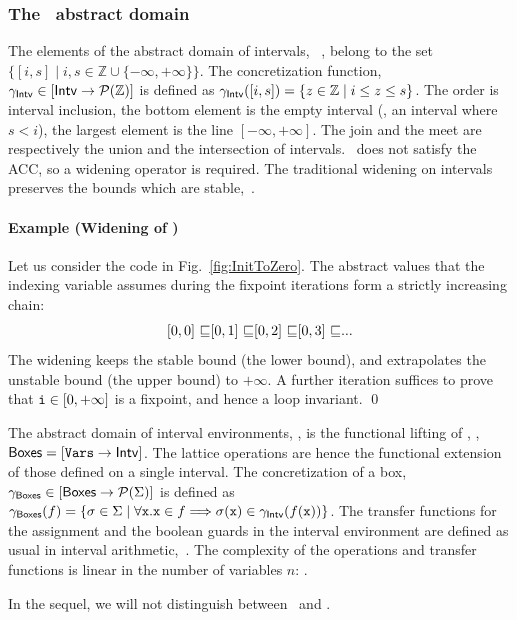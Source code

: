 \documentclass[10pt]{sigplanconf}
\begin{document}
\subsubsection*{The \Intervals\  abstract domain}
The elements of the abstract domain of intervals, \Intervals  ~\cite{CousotCousot77}, belong to the set $\{ [i, s] \mid i,s \in \mathbb{Z} \cup \{-\infty, + \infty\} \}$.
The concretization function, $\gamma_{\mathsf{Intv}} \in [\mathsf{Intv} \rightarrow\mathcal{P}{(\mathbb{Z})}]$ is defined as $\gamma_{\mathsf{Intv}}([i, s]) = \{ z \in \mathbb{Z} \mid i \leq z \leq s\}$.
The order is interval inclusion, the bottom  element is the empty interval (\ie, an interval where $s < i$), the largest element is the line $[-\infty, +\infty]$. The join and the meet are respectively the union and the intersection of intervals.
\Intervals\ does not satisfy the ACC, so a widening operator is required.
 The traditional  widening on intervals preserves the bounds which are stable,~\cite{CousotCousot77}. 

\paragraph{Example (Widening of \Intervals)}
Let us consider the code in Fig.~\ref{fig:InitToZero}.
The abstract values that the indexing variable  assumes  during the fixpoint iterations form a strictly increasing chain:   
\[
[0, 0] \ \aless [0, 1] \ \aless [0, 2] \ \aless [0, 3] \ \aless ... 
\]
The widening  keeps the stable bound (the lower bound), and extrapolates the unstable bound (the upper bound) to $+\infty$.
A further iteration suffices to prove that $\mathtt{i} \in [0, +\infty]$ is a fixpoint, and hence a loop invariant. \qed


The abstract domain of interval environments, \Boxes, is the functional lifting of \Intervals, \ie, $\mathsf{Boxes} =  [\mathtt{Vars} \rightarrow\mathsf{Intv}]$.
The lattice operations are hence the functional extension of those defined on a single interval.
The concretization of a box, $\gamma_{\mathsf{Boxes}} \in [\mathsf{Boxes} \rightarrow\mathcal{P}{(\Sigma)}]$ is defined as $\gamma_{\mathsf{Boxes}}(f) = \{ \sigma \in \Sigma \mid \forall \mathtt{x}. \mathtt{x} \in f \Longrightarrow \sigma(\mathtt{x}) \in \gamma_{\mathsf{Intv}}(f(\mathtt{x}))\}$.
The transfer functions for the assignment and the boolean guards in the interval environment are defined as usual in interval arithmetic,~\cite{Cousot98}.
The complexity of the   operations and transfer functions is linear in the number of variables $n$: .

In the sequel, we will not distinguish between \Intervals\  and \Boxes.
\end{document}

